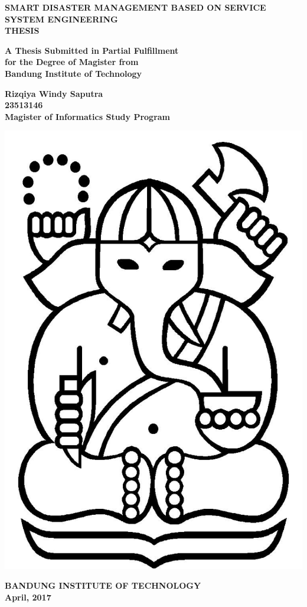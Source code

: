 \documentclass[12pt]{report}
\numberwithin{figure}{section}
\numberwithin {figure}{subsection}
\numberwithin {table}{section}
\numberwithin {table}{subsection}
\begin{document}
\begin{titlepage}
\begin{center}
	\vspace{1cm}
	\large
		\textbf{SMART DISASTER MANAGEMENT BASED ON SERVICE SYSTEM ENGINEERING}\\
	
	\vspace{3cm}
	\textbf{THESIS}
	
	\normalsize
		\textbf{A Thesis Submitted in Partial Fulfillment\\
		for the Degree of Magister from\\
		Bandung Institute of Technology}
	
	\vfill
	\large
		\textbf{Rizqiya Windy Saputra}\\
		\textbf{23513146}\\
		\textbf{Magister of Informatics Study Program}
	
	\vspace{1cm}
	\includegraphics[scale=0.2]{logo-itb.jpg}
	
	\large
		\textbf{BANDUNG INSTITUTE OF TECHNOLOGY\\
		April, 2017}
\end{center}
\end{titlepage}
\cleardoublepage
\end{document}
